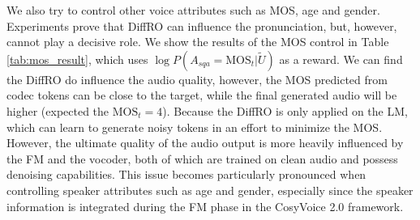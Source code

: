 \documentclass[a4paper]{article}
\begin{document}

We also try to control other voice attributes such as MOS, age and gender. Experiments prove that DiffRO can influence the pronunciation, but, however, cannot play a decisive role. We show the results of the MOS control in Table \ref{tab:mos_result}, which uses $\log P(A_{sqa}=\text{MOS}_{t}|\tilde{U})$ as a reward. We can find the DiffRO do influence the audio quality, however, the MOS predicted from codec tokens can be close to the target, while the final generated audio will be higher (expected the $\text{MOS}_t=4$). 
Because the DiffRO is only applied on the LM, which can learn to generate noisy tokens in an effort to minimize the MOS. However, the ultimate quality of the audio output is more heavily influenced by the FM and the vocoder, both of which are trained on clean audio and possess denoising capabilities. This issue becomes particularly pronounced when controlling speaker attributes such as age and gender, especially since the speaker information is integrated during the FM phase in the CosyVoice 2.0 framework.
\end{document}

